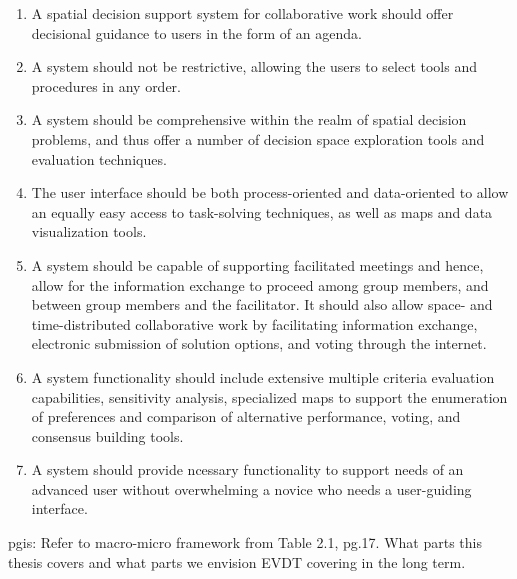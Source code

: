 \begin{enumerate}
    \setlength{\itemsep}{0pt}%
    \setlength{\parskip}{0pt}%
	\item{A spatial decision support system for collaborative work should offer decisional guidance to users in the form of an agenda.}
	\item{A system should not be restrictive, allowing the users to select tools and procedures in any order.}
	\item{A system should be comprehensive within the realm of spatial decision problems, and thus offer a number of decision space exploration tools and evaluation techniques.}
	\item{The user interface should be both process-oriented and data-oriented to allow an equally easy access to task-solving techniques, as well as maps and data visualization tools.}
	\item{A system should be capable of supporting facilitated meetings and hence, allow for the information exchange to proceed among group members, and between group members and the facilitator. It should also allow space- and time-distributed collaborative work by facilitating information exchange, electronic submission of solution options, and voting through the internet.}
	\item{A system functionality should include extensive multiple criteria evaluation capabilities, sensitivity analysis, specialized maps to support the enumeration of preferences and comparison of alternative performance, voting, and consensus building tools.}
	\item{A system should provide ncessary functionality to support needs of an advanced user without overwhelming a novice who needs a user-guiding interface.}
\end{enumerate}

\ac{pgis}: Refer to macro-micro framework from Table 2.1, pg.17. What parts this thesis covers and what parts we envision EVDT covering in the long term.

